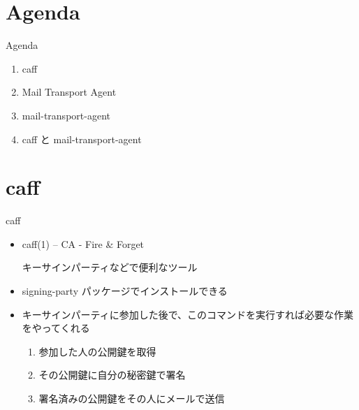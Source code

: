 \frame{\titlepage{}}

\section{Agenda}

\begin{frame}{Agenda}
\begin{enumerate}
 \item caff
 \item Mail Transport Agent
 \item mail-transport-agent
 \item caff と mail-transport-agent
\end{enumerate}
\end{frame}

\section{caff}
\begin{frame}{caff}
\begin{itemize}
 \item caff(1) -- CA - Fire \& Forget

 キーサインパーティなどで便利なツール

 \item 
 signing-party パッケージでインストールできる

 \item 
 キーサインパーティに参加した後で、このコマンドを実行すれば必要な作業をやってくれる

 \pause

 \begin{enumerate}
  \item 参加した人の公開鍵を取得
  \item その公開鍵に自分の秘密鍵で署名
  \item 署名済みの公開鍵をその人にメールで送信
 \end{enumerate}

\end{itemize}
  
\end{frame}

